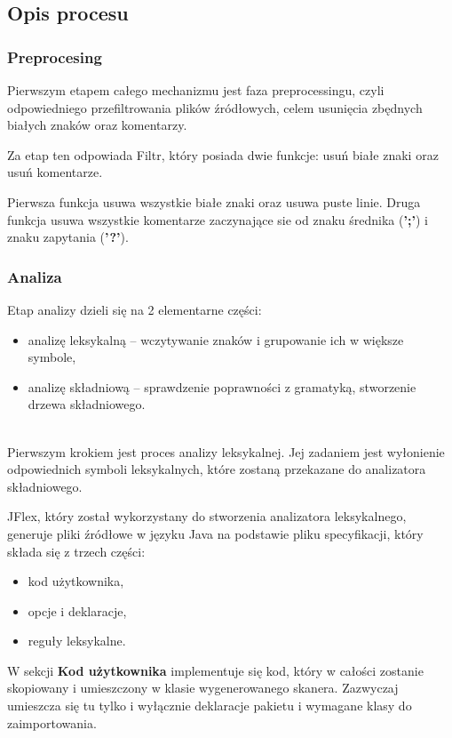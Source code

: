 \documentclass[a4paper,12pt,twoside]{article}
\begin{document}
\newpage

\subsection{Opis procesu}

\subsubsection{Preprocesing}

Pierwszym etapem całego mechanizmu jest faza preprocessingu, czyli odpowiedniego przefiltrowania plików źródłowych, celem usunięcia zbędnych białych znaków oraz komentarzy.

Za etap ten odpowiada Filtr, który posiada dwie funkcje: usuń białe znaki oraz usuń komentarze.

Pierwsza funkcja usuwa wszystkie białe znaki oraz usuwa puste linie. Druga funkcja usuwa wszystkie komentarze zaczynające sie od znaku średnika (\textbf{';'}) i znaku zapytania (\textbf{'?'}).

\subsubsection{Analiza}

Etap analizy dzieli się na 2 elementarne części:
\begin{itemize}
\item analizę leksykalną – wczytywanie znaków i grupowanie ich w większe symbole,
\item analizę składniową – sprawdzenie poprawności z gramatyką, stworzenie drzewa składniowego.
\end{itemize}
\\

Pierwszym krokiem jest proces analizy leksykalnej. Jej zadaniem jest wyłonienie odpowiednich symboli leksykalnych, które zostaną przekazane do analizatora składniowego.

JFlex\cite{jflex}, który został wykorzystany do stworzenia analizatora leksykalnego, generuje pliki źródłowe w języku Java na podstawie pliku specyfikacji, który składa się z trzech części:
\begin{itemize}
\item kod użytkownika,
\item opcje i deklaracje,
\item reguły leksykalne.
\end{itemize}

W sekcji \textbf{Kod użytkownika} implementuje się kod, który w całości zostanie skopiowany i umieszczony w klasie wygenerowanego skanera. Zazwyczaj umieszcza się tu tylko i wyłącznie deklaracje pakietu i wymagane klasy do zaimportowania.
\end{document}

